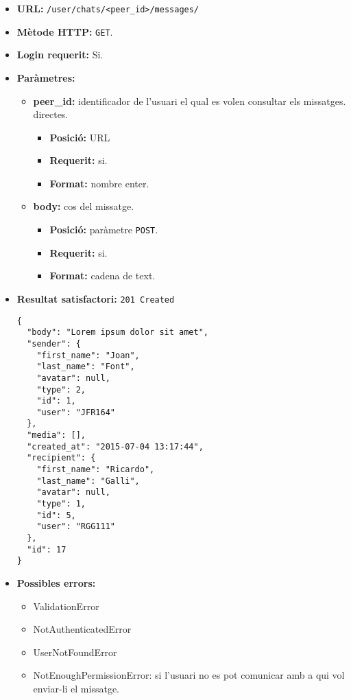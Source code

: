 	\begin{itemize}
	\item \textbf{\ac{URL}:} \texttt{/user/chats/<peer\_id>/messages/}
	\item \textbf{Mètode \ac{HTTP}: } \texttt{GET}.
	\item \textbf{Login requerit:} Si.
	\item \textbf{Paràmetres:}
	\begin{itemize}
		\item \textbf{peer\_id:} identificador de l'usuari el qual es volen consultar els missatges. directes.
		\begin{itemize}
			\item \textbf{Posició:} \ac{URL}
			\item \textbf{Requerit:} si.
			\item \textbf{Format:} nombre enter.
		\end{itemize}
		\item \textbf{body:} cos del missatge.
		\begin{itemize}
			\item \textbf{Posició:} paràmetre \texttt{POST}.
			\item \textbf{Requerit:} si.
			\item \textbf{Format:} cadena de text.
		\end{itemize}
	\end{itemize}
	\item \textbf{Resultat satisfactori:} \texttt{201 Created}
	\begin{verbatim}
{
  "body": "Lorem ipsum dolor sit amet",
  "sender": {
    "first_name": "Joan",
    "last_name": "Font",
    "avatar": null,
    "type": 2,
    "id": 1,
    "user": "JFR164"
  },
  "media": [],
  "created_at": "2015-07-04 13:17:44",
  "recipient": {
    "first_name": "Ricardo",
    "last_name": "Galli",
    "avatar": null,
    "type": 1,
    "id": 5,
    "user": "RGG111"
  },
  "id": 17
}
	\end{verbatim}
	\item \textbf{Possibles errors:}
	\begin{itemize}
		\item ValidationError
		\item NotAuthenticatedError
		\item UserNotFoundError
		\item NotEnoughPermissionError: si l'usuari no es pot comunicar amb a qui vol enviar-li el missatge.
	\end{itemize}
	\end{itemize}


